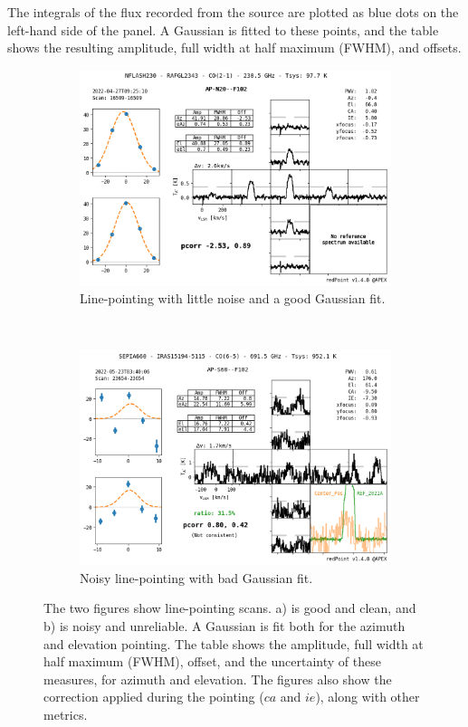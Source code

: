 The integrals of the flux recorded from the source are plotted as blue dots on the left-hand side of the panel.
A Gaussian is fitted to these points, and the table shows the resulting amplitude, full width at half maximum (FWHM), and offsets.

\begin{figure}[H]
    \centering
     \begin{subfigure}[b]{0.75\textwidth}
         \centering
         \includegraphics[width=\textwidth]{Pointing Scans/good_line.png}
         \caption{Line-pointing with little noise and a good Gaussian fit.}
         \label{subfig:good_line}
     \end{subfigure}
    \\
     \begin{subfigure}[b]{0.75\textwidth}
         \centering
         \includegraphics[width=\textwidth]{Pointing Scans/bad_line.png}
         \caption{Noisy line-pointing with bad Gaussian fit.}
         \label{subfig:bad_line}
     \end{subfigure}
    \caption{The two figures show line-pointing scans. a) is good and clean, and b) is noisy and unreliable. A Gaussian is fit both for the azimuth and elevation pointing.
    The table shows the amplitude, full width at half maximum (FWHM), offset, and the uncertainty of these measures, for azimuth and elevation.
    The figures also show the correction applied during the pointing ($ca$ and $ie$), along with other metrics.}
    \label{fig:line_pointings}
\end{figure}

